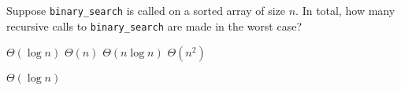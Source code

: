\begin{prob}
    Suppose \texttt{binary_search} is called on a sorted array of
    size $n$. In total, how many recursive calls to
    \texttt{binary_search} are made in the worst case?

    \begin{choices}
        \correctchoice $\Theta(\log n)$
        \choice $\Theta(n)$
        \choice $\Theta(n \log n)$
        \choice $\Theta(n^2)$
    \end{choices}

    \begin{soln}
        $\Theta(\log n)$
    \end{soln}

\end{prob}
